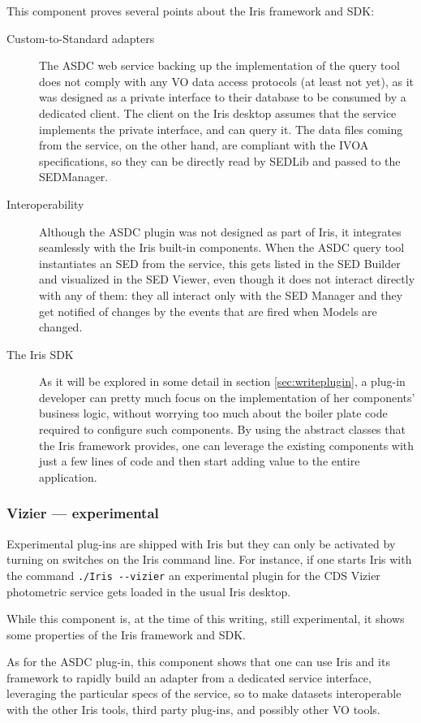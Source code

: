 \documentclass[final,5p,authoryear]{elsarticle}
\begin{document}
This component proves several points about the Iris framework and SDK:
\begin{description} \item[Custom-to-Standard adapters] The ASDC web service
backing up the implementation of the query tool does not comply with any VO data
access protocols (at least not yet), as it was designed as a private interface
to their database to be consumed by a dedicated client. The client on the Iris
desktop assumes that the service implements the private interface, and can query
it. The data files coming from the service, on the other hand, are compliant
with the IVOA specifications, so they can be directly read by SEDLib and passed
to the SEDManager.  \item[Interoperability] Although the ASDC plugin was not
designed as part of Iris, it integrates seamlessly with the Iris built-in
components. When the ASDC query tool instantiates an SED from the service, this
gets listed in the SED Builder and visualized in the SED Viewer, even though it
does not interact directly with any of them: they all interact only with the SED
Manager and they get notified of changes by the events that are fired when
Models are changed.  \item[The Iris SDK] As it will be explored in some detail
in section \ref{sec:writeplugin}, a plug-in developer can pretty much focus on
the implementation of her components' business logic, without worrying too much
about the boiler plate code required to configure such components. By using the
abstract classes that the Iris framework provides, one can leverage the existing
components with just a few lines of code and then start adding value to the
entire application.  \end{description}

\subsubsection{Vizier --- experimental} \label{sec:asdc} Experimental plug-ins
are shipped with Iris but they can only be activated by turning on switches on
the Iris command line. For instance, if one starts Iris with the command
\verb|./Iris --vizier| an experimental plugin for the CDS Vizier photometric
service gets loaded in the usual Iris desktop.

While this component is, at the time of this writing, still experimental, it
shows some properties of the Iris framework and SDK.

As for the ASDC plug-in, this component shows that one can use Iris and its
framework to rapidly build an adapter from a dedicated service interface,
leveraging the particular specs of the service, so to make datasets
interoperable with the other Iris tools, third party plug-ins, and possibly
other VO tools.
\end{document}
